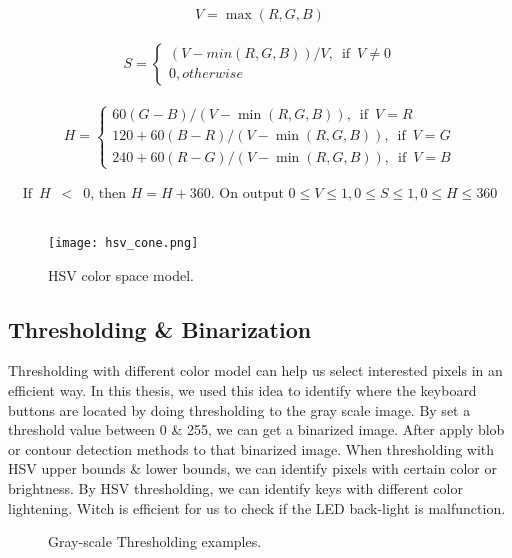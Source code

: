             $$
                V = \max(R,G,B)
            $$\\
            $$
                S = 
                \begin{cases}   
                    {{{(V-min(R,G,B))}/{V}}, \enspace\textrm{if}\enspace V \neq 0}\\
                    {0, otherwise}
                \end{cases}
            $$\\
            $$
                H =
                \begin{cases} 
                    {{60(G - B)}/{(V-\min(R,G,B))}, \enspace\textrm{if}\enspace V=R}\\
                    {{120+60(B - R)}/{(V-\min(R,G,B))}, \enspace\textrm{if}\enspace V=G}\\
                    {{240+60(R - G)}/{(V-\min(R,G,B))}, \enspace\textrm{if}\enspace V=B}
                \end{cases}
            $$\\
            $$
                \textrm{If} \enspace H \enspace < \enspace 0 \textrm{, then } H = H + 360. \textrm{ On output } 0 \leq V \leq 1, 0 \leq S \leq 1, 0 \leq H \leq 360
            $$\\
            \begin{figure}[H]
                \begin{center}
                    \texttt{[image: hsv\_cone.png]}
                    \caption{HSV color space model.}
                    \label{fig:HSV_model}
                \end{center}
            \end{figure}
    \subsection{Thresholding \& Binarization}
        Thresholding with different color model can help us select interested pixels in an efficient way.
        In this thesis, we used this idea to identify where the keyboard buttons are located by doing thresholding to the gray scale image.
        By set a threshold value between 0 \& 255, we can get a binarized image.
        After apply blob or contour detection methods to that  binarized image.
        When thresholding with HSV upper bounds \& lower bounds, we can identify pixels with certain color or brightness.
        By HSV thresholding, we can identify keys with different color lightening.
        Witch is efficient for us to check if the LED back-light is malfunction.
        \begin{figure}[H]
            \caption{Gray-scale Thresholding examples.}
            \label{fig:HSV_detection_Example}
        \end{figure}

